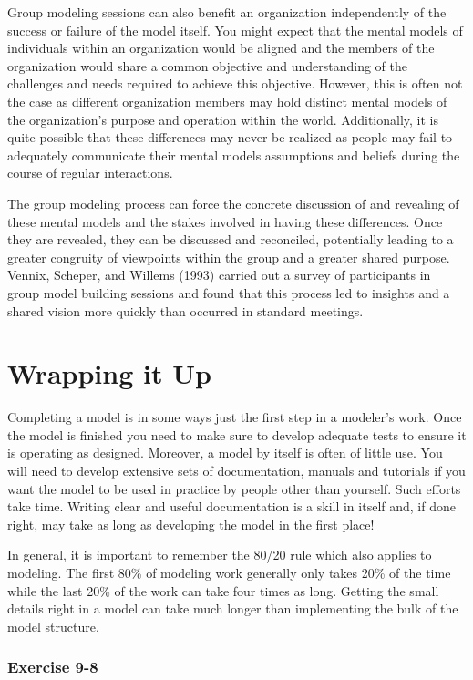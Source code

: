 \documentclass[]{memoir}
\begin{document}
Group modeling sessions can also benefit an organization independently
of the success or failure of the model itself. You might expect that the
mental models of individuals within an organization would be aligned and
the members of the organization would share a common objective and
understanding of the challenges and needs required to achieve this
objective. However, this is often not the case as different organization
members may hold distinct mental models of the organization's purpose
and operation within the world. Additionally, it is quite possible that
these differences may never be realized as people may fail to adequately
communicate their mental models assumptions and beliefs during the
course of regular interactions.

The group modeling process can force the concrete discussion of and
revealing of these mental models and the stakes involved in having these
differences. Once they are revealed, they can be discussed and
reconciled, potentially leading to a greater congruity of viewpoints
within the group and a greater shared purpose. Vennix, Scheper, and
Willems (1993) carried out a survey of participants in group model
building sessions and found that this process led to insights and a
shared vision more quickly than occurred in standard meetings.

\section{Wrapping it Up}

Completing a model is in some ways just the first step in a modeler's
work. Once the model is finished you need to make sure to develop
adequate tests to ensure it is operating as designed. Moreover, a model
by itself is often of little use. You will need to develop extensive
sets of documentation, manuals and tutorials if you want the model to be
used in practice by people other than yourself. Such efforts take time.
Writing clear and useful documentation is a skill in itself and, if done
right, may take as long as developing the model in the first place!

In general, it is important to remember the 80/20 rule which also
applies to modeling. The first 80\% of modeling work generally only
takes 20\% of the time while the last 20\% of the work can take four
times as long. Getting the small details right in a model can take much
longer than implementing the bulk of the model structure.

\subsubsection{Exercise 9-8}
\end{document}
